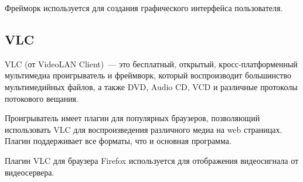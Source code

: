 Фрейморк используется для создания графического интерфейса пользователя.

\subsection{VLC}
VLC (от VideoLAN Client)~--- это бесплатный, открытый, кросс-платформенный мультимедиа
проигрыватель и фреймворк, который воспроизводит большинство мультимедийных файлов,
а также DVD, Audio CD, VCD и различные протоколы потокового вещания.

Проигрыватель имеет плагин для популярных браузеров, позволяющий использовать VLC для воспроизведения
различного медиа на web страницах. Плагин поддерживает все форматы, что и основная программа.

Плагин VLC для браузера Firefox используется для отображения видеосигнала от видеосервера.
